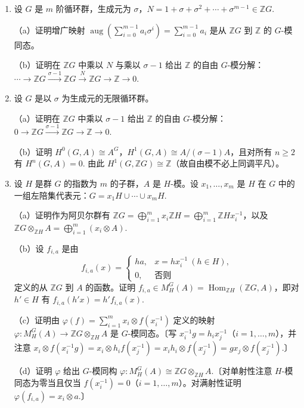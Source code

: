 \begin{enumerate}
\item 设 \(G\) 是 \(m\) 阶循环群，生成元为 \(\sigma\)，\(N = 1+\sigma+\sigma^2+\cdots+\sigma^{m-1} \in \mathbb{Z}G\).

（a）证明增广映射 \(\operatorname{aug}(\sum_{i=0}^{m-1}a_i\sigma^i) = \sum_{i=0}^{m-1}a_i\) 是从 \(\mathbb{Z}G\) 到 \(\mathbb{Z}\) 的 \(G\)-模同态。

（b）证明在 \(\mathbb{Z}G\) 中乘以 \(N\) 与乘以 \(\sigma-1\) 给出 \(\mathbb{Z}\) 的自由 \(G\)-模分解：\(\cdots \to \mathbb{Z}G \xrightarrow{\sigma-1} \mathbb{Z}G \xrightarrow{N} \mathbb{Z}G \to \mathbb{Z} \to 0\).

\item 设 \(G\) 是以 \(\sigma\) 为生成元的无限循环群。

（a）证明在 \(\mathbb{Z}G\) 中乘以 \(\sigma-1\) 给出 \(\mathbb{Z}\) 的自由 \(G\)-模分解：\(0 \to \mathbb{Z}G \xrightarrow{\sigma-1} \mathbb{Z}G \to \mathbb{Z} \to 0\).

（b）证明 \(H^0(G, A) \cong A^G\)，\(H^1(G, A) \cong A/(\sigma-1)A\)，且对所有 \(n \geq 2\) 有 \(H^n(G, A) = 0\). 由此 \(H^1(G, \mathbb{Z}G) \cong \mathbb{Z}\)（故自由模不必上同调平凡）。

\item 设 \(H\) 是群 \(G\) 的指数为 \(m\) 的子群，\(A\) 是 \(H\)-模。设 \(x_1, \ldots, x_m\) 是 \(H\) 在 \(G\) 中的一组左陪集代表元：\(G = x_1H \cup \cdots \cup x_mH\).

（a）证明作为阿贝尔群有 \(\mathbb{Z}G = \bigoplus_{i=1}^{m}x_i\mathbb{Z}H = \bigoplus_{i=1}^{m}\mathbb{Z}Hx_i^{-1}\)，以及 \(\mathbb{Z}G \otimes_{\mathbb{Z}H}A = \bigoplus_{i=1}^{m}(x_i \otimes A)\).

（b）设 \(f_{i,a}\) 是由
\[
f_{i,a}(x) = \begin{cases}ha, & x = hx_i^{-1}\ (h \in H),\\ 0, & \text{否则}\end{cases}
\]
定义的从 \(\mathbb{Z}G\) 到 \(A\) 的函数。证明 \(f_{i,a} \in M_H^G(A) = \operatorname{Hom}_{\mathbb{Z}H}(\mathbb{Z}G, A)\)，即对 \(h' \in H\) 有 \(f_{i,a}(h'x) = h'f_{i,a}(x)\).

（c）证明由 \(\varphi(f) = \sum_{i=1}^{m}x_i \otimes f(x_i^{-1})\) 定义的映射 \(\varphi : M_H^G(A) \to \mathbb{Z}G \otimes_{\mathbb{Z}H}A\) 是 \(G\)-模同态。〔写 \(x_i^{-1}g = h_ix_j^{-1}\)（\(i = 1, \ldots, m\)），并注意 \(x_i \otimes f(x_i^{-1}g) = x_i \otimes h_if(x_j^{-1}) = x_ih_i \otimes f(x_j^{-1}) = gx_j \otimes f(x_j^{-1})\).〕

（d）证明 \(\varphi\) 给出 \(G\)-模同构 \(\varphi : M_H^G(A) \cong \mathbb{Z}G \otimes_{\mathbb{Z}H}A\).〔对单射性注意 \(H\)-模同态为零当且仅当 \(f(x_i^{-1}) = 0\)（\(i = 1, \ldots, m\)）。对满射性证明 \(\varphi(f_{i,a}) = x_i \otimes a\).〕


\end{enumerate}
